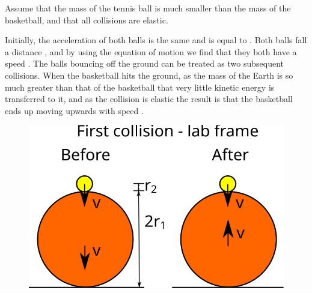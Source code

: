 
\begin{problem}[Superball] 
{ 

Assume that the mass of the tennis ball is much smaller than the mass of the basketball, and that all collisions are elastic.}
{}
{Initially, the acceleration of both balls is the same and is equal to . Both balls fall a distance , and by using the equation of motion  we find that they both have a speed . The balls bouncing off the ground can be treated as two subsequent collisions. When the basketball hits the ground, as the mass of the Earth is so much greater than that of the basketball that very little kinetic energy is transferred to it, and as the collision is elastic the result is that the basketball ends up moving upwards with speed .

\begin{figure}[h]
\centering
\includegraphics[width=1.0\textwidth]{../../../figures/dynamics_tennis_basket_ball_first.svg}
\caption{}\label{fig:dynamics_tennis_basket_first}
\end{figure}

}
\end{problem}
